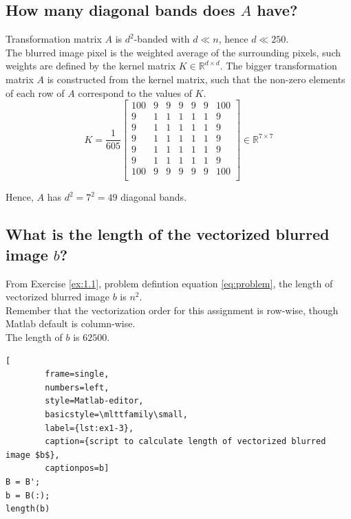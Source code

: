 \documentclass[unicode,11pt,a4paper,oneside,numbers=endperiod,openany]{scrartcl}
\begin{document}
\subsection{How many diagonal bands does $A$ have?}
Transformation matrix $A$ is $d^2$-banded with $d \ll n$, hence $d \ll 250$.\\
The blurred image pixel is the weighted average of the surrounding pixels,
such weights are defined by the kernel
matrix $K \in \mathbb{R}^{d \times d}$.
The bigger transformation matrix $A$ is constructed from the kernel matrix,
such that the non-zero elements of each row of $A$ correspond to the values of $K$.\\
\[
    K =
    \frac{1}{605}
    \begin{bmatrix}
        100 & 9 & 9 & 9 & 9 & 9 & 100 \\
        9   & 1 & 1 & 1 & 1 & 1 & 9   \\
        9   & 1 & 1 & 1 & 1 & 1 & 9   \\
        9   & 1 & 1 & 1 & 1 & 1 & 9   \\
        9   & 1 & 1 & 1 & 1 & 1 & 9   \\
        9   & 1 & 1 & 1 & 1 & 1 & 9   \\
        100 & 9 & 9 & 9 & 9 & 9 & 100 \\
    \end{bmatrix}
    \in \mathbb{R}^{7 \times 7}
\]

Hence, $A$ has $d^2 = 7^2 = 49$ diagonal bands.

\subsection{What is the length of the vectorized blurred image $b$?}

From Exercise \ref{ex:1.1}, problem defintion equation \ref{eq:problem},
the length of vectorized blurred image $b$ is $n^2$.\\
Remember that the vectorization order for this assignment is row-wise,
though Matlab default is column-wise.\\
The length of $b$ is $62500$.

\begin{lstlisting}[
        frame=single,
        numbers=left,
        style=Matlab-editor,
        basicstyle=\mlttfamily\small,
        label={lst:ex1-3},
        caption={script to calculate length of vectorized blurred image $b$},
        captionpos=b]
B = B';
b = B(:);
length(b)  
\end{lstlisting}
\end{document}
